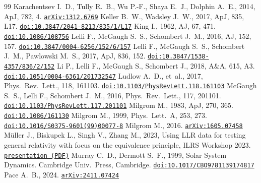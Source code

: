 \documentclass[11pt]{article}
\begin{document}
\begin{thebibliography}{99}
 Karachentsev I.~D., Tully R.~B., Wu P.-F., Shaya E.~J., Dolphin A.~E., 2014, ApJ, 782, 4. \href{https://arxiv.org/abs/1312.6769}{\texttt{arXiv:1312.6769}}
 Keller B.~W., Wadsley J.~W., 2017, ApJ, 835, L17. \href{https://doi.org/10.3847/2041-8213/835/1/L17}{\texttt{doi:10.3847/2041-8213/835/1/L17}}
 King I., 1962, AJ, 67, 471. \href{https://doi.org/10.1086/108756}{\texttt{doi:10.1086/108756}}
 Lelli F., McGaugh S.~S., Schombert J.~M., 2016, AJ, 152, 157. \href{https://doi.org/10.3847/0004-6256/152/6/157}{\texttt{doi:10.3847/0004-6256/152/6/157}}
 Lelli F., McGaugh S.~S., Schombert J.~M., Pawlowski M.~S., 2017, ApJ, 836, 152. \href{https://doi.org/10.3847/1538-4357/836/2/152}{\texttt{doi:10.3847/1538-4357/836/2/152}}
 Li P., Lelli F., McGaugh S., Schombert J., 2018, A\&A, 615, A3. \href{https://doi.org/10.1051/0004-6361/201732547}{\texttt{doi:10.1051/0004-6361/201732547}}
 Ludlow A.~D., et~al., 2017, Phys.\ Rev.\ Lett., 118, 161103. \href{https://doi.org/10.1103/PhysRevLett.118.161103}{\texttt{doi:10.1103/PhysRevLett.118.161103}}
 McGaugh S.~S., Lelli F., Schombert J.~M., 2016, Phys.\ Rev.\ Lett., 117, 201101. \href{https://doi.org/10.1103/PhysRevLett.117.201101}{\texttt{doi:10.1103/PhysRevLett.117.201101}}
 Milgrom M., 1983, ApJ, 270, 365. \href{https://doi.org/10.1086/161130}{\texttt{doi:10.1086/161130}}
 Milgrom M., 1999, Phys.\ Lett.\ A, 253, 273. \href{https://doi.org/10.1016/S0375-9601(99)00077-8}{\texttt{doi:10.1016/S0375-9601(99)00077-8}}
 Milgrom M., 2016. \href{https://arxiv.org/abs/1605.07458}{\texttt{arXiv:1605.07458}}
 M\"uller J., Biskupek L., Singh V., Zhang M., 2023, Using LLR data for testing general relativity with focus on the equivalence principle, ILRS Workshop 2023. \href{https://ilrs.cddis.eosdis.nasa.gov/lw23/docs/presentations/S03/S03-03_LLR-ILRS-WS2023JM_Jurgen_presentation.pdf}{\texttt{presentation (PDF)}}
 Murray C.~D., Dermott S.~F., 1999, Solar System Dynamics. Cambridge Univ.\ Press, Cambridge. \href{https://doi.org/10.1017/CBO9781139174817}{\texttt{doi:10.1017/CBO9781139174817}}
 Pace A.~B., 2024. \href{https://arxiv.org/abs/2411.07424}{\texttt{arXiv:2411.07424}}

\end{thebibliography}
\end{document}
